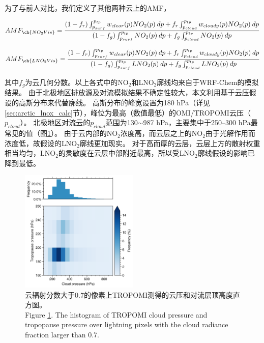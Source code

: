 为了与前人对比，我们定义了其他两种云上的AMF，

\begin{equation} \label{eq:AMF_NO2Vis}
AMF_{\ch{NO_2Vis}} = \frac{(1-f_r) \int_{p_{surf}}^{p_{tp}} w_{clear}(p) NO_2(p) \: dp + f_r \int_{p_{cloud}}^{p_{tp}} w_{cloudy}(p) NO_2(p) \: dp}{(1-f_g) \int_{p_{surf}}^{p_{tp}} NO_2(p) \: dp + f_g \int_{p_{cloud}}^{p_{tp}} NO_2(p) \: dp}
\end{equation}

\begin{equation} \label{eq:AMF_LNO2Vis}
AMF_{\ch{LNO_2Vis}} = \frac{(1-f_r) \int_{p_{surf}}^{p_{tp}} w_{clear}(p) NO_2(p) \: dp + f_r \int_{p_{cloud}}^{p_{tp}} w_{cloudy}(p) NO_2(p) \: dp}{(1-f_g) \int_{p_{surf}}^{p_{tp}} LNO_2(p) \: dp + f_g \int_{p_{cloud}}^{p_{tp}} LNO_2(p) \: dp}
\end{equation}

其中$f_g$为云几何分数。以上各式中的NO$_2$和LNO$_2$廓线均来自于WRF-Chem的模拟结果。
由于北极地区排放源及对流模拟结果不确定性较大，本文利用基于云压假设的高斯分布来代替廓线。
高斯分布的峰宽设置为180 hPa（详见\ref{sec:arctic_lnox_calc}节），峰位为最高（数值最低）的OMI/TROPOMI云压（$p_{cloud}$）。
北极地区对流云的$p_{cloud}$范围为130$\sim$987 hPa，主要集中于250--300 hPa最常见的值（图\ref{fig:pcld_ptropo}）。
由于云内部的NO$_2$浓度高，而云层之上的NO$_2$由于光解作用而浓度低，故假设的LNO$_2$廓线更加现实\citep{Beirle.2009}。
对于高而厚的云层，云层上方的散射权重相当均匀，LNO$_2$的灵敏度在云层中部附近最高，所以受LNO$_2$廓线假设的影响已降到最低\citep{Laughner.2017}。

\begin{figure}[!htbp]
\centering
\includegraphics[width=0.5\textwidth]{./figures/pcld_ptropo.png}
\caption{云辐射分数大于0.7的像素上TROPOMI测得的云压和对流层顶高度直方图。\\
Figure \ref{fig:pcld_ptropo}. The histogram of TROPOMI cloud pressure and tropopause pressure over lightning
pixels with the cloud radiance fraction larger than 0.7.
}
\label{fig:pcld_ptropo}
\end{figure}

